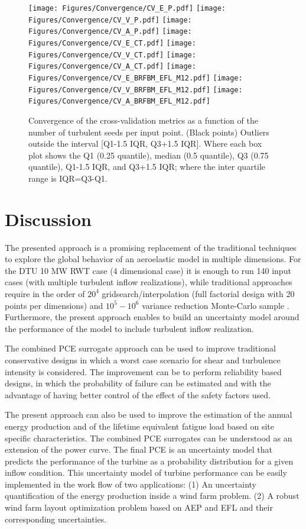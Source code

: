 \documentclass[preprint,12pt]{elsarticle}
\begin{document}
\begin{figure}[h!]
\begin{centering}
\texttt{[image: Figures/Convergence/CV\_E\_P.pdf]}
\texttt{[image: Figures/Convergence/CV\_V\_P.pdf]}
\texttt{[image: Figures/Convergence/CV\_A\_P.pdf]}
\texttt{[image: Figures/Convergence/CV\_E\_CT.pdf]}
\texttt{[image: Figures/Convergence/CV\_V\_CT.pdf]}
\texttt{[image: Figures/Convergence/CV\_A\_CT.pdf]}
\texttt{[image: Figures/Convergence/CV\_E\_BRFBM\_EFL\_M12.pdf]}
\texttt{[image: Figures/Convergence/CV\_V\_BRFBM\_EFL\_M12.pdf]}
\texttt{[image: Figures/Convergence/CV\_A\_BRFBM\_EFL\_M12.pdf]}
\caption{Convergence of the cross-validation metrics as a function of the number of turbulent seeds per input point. (Black points) Outliers outside the interval [Q1-1.5 IQR, Q3+1.5 IQR]. Where each box plot shows the Q1 (0.25 quantile), median (0.5 quantile), Q3 (0.75 quantile), Q1-1.5 IQR, and Q3+1.5 IQR; where the inter quartile range is IQR=Q3-Q1.}
\label{fig_convergence}
\end{centering}
\end{figure}

\section{Discussion}


The presented approach is a promising replacement of the traditional techniques to explore the global behavior of an aeroelastic model in multiple dimensions. For the DTU 10 MW RWT case (4 dimensional case) it is enough to run 140 input cases (with multiple turbulent inflow realizations), while traditional approaches require in the order of $20^4$ gridsearch/interpolation (full factorial design with  20 points per dimensions) and $10^5-10^6$ variance reduction Monte-Carlo sample \cite{dimitrov2015model}. Furthermore, the present approach enables to build an uncertainty model around the performance of the model to include turbulent inflow realization.

The combined PCE surrogate approach can be used to improve traditional conservative designs in which a worst case scenario for shear and turbulence intensity is considered. The improvement can be to perform reliability based designs, in which the probability of failure can be estimated and with the advantage of having better control of the effect of the safety factors used.

The present approach can also be used to improve the estimation of the annual energy production and of the lifetime equivalent fatigue load based on site specific characteristics. The combined PCE surrogates can be understood as an extension of the power curve. The final PCE is an uncertainty model that predicts the performance of the turbine as a probability distribution for a given inflow condition. This uncertainty model of turbine performance can be easily implemented in the work flow of two applications: (1) An uncertainty quantification of the energy production inside a wind farm problem. (2) A robust wind farm layout optimization problem based on AEP and EFL and their corresponding uncertainties.
\end{document}
